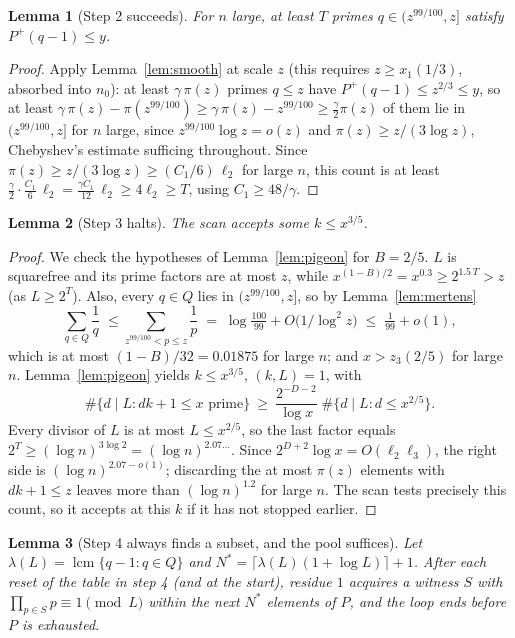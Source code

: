 \documentclass[11pt]{amsart}
\newtheorem{lemma}{Lemma}[section]
\begin{document}
\begin{lemma}[Step 2 succeeds]
For $n$ large, at least $T$ primes $q \in (z^{99/100}, z]$ satisfy
$P^+(q-1) \le y$.
\end{lemma}

\begin{proof}
Apply Lemma~\ref{lem:smooth} at scale $z$ (this requires
$z \ge x_1(1/3)$, absorbed into $n_0$): at least $\gamma\,\pi(z)$ primes
$q \le z$ have $P^+(q-1) \le z^{2/3} \le y$, so at least
$\gamma\,\pi(z) - \pi(z^{99/100}) \ge \gamma\,\pi(z) - z^{99/100}
\ge \tfrac{\gamma}{2}\pi(z)$ of them lie
in $(z^{99/100}, z]$ for $n$ large, since
$z^{99/100}\log z = o(z)$ and $\pi(z) \ge z/(3\log z)$, Chebyshev's
estimate sufficing throughout. Since
$\pi(z) \ge z/(3\log z) \ge (C_1/6)\,\ell_2$ for
large $n$, this count is at least
$\tfrac{\gamma}{2}\cdot\tfrac{C_1}{6}\,\ell_2 = \tfrac{\gamma C_1}{12}\,\ell_2
\ge 4\ell_2 \ge T$, using $C_1 \ge 48/\gamma$.
\end{proof}

\begin{lemma}[Step 3 halts]
\label{lem:halt}
The scan accepts some $k \le x^{3/5}$.
\end{lemma}

\begin{proof}
We check the hypotheses of Lemma~\ref{lem:pigeon} for $B = 2/5$. $L$ is
squarefree and its prime factors are at most $z$, while
$x^{(1-B)/2} = x^{0.3} \ge 2^{1.5\,T} > z$ (as $L \ge 2^T$). Also, every $q \in Q$ lies in $(z^{99/100}, z]$, so by
Lemma~\ref{lem:mertens}
\[
\sum_{q \in Q} \frac{1}{q}
\;\le \sum_{z^{99/100} < p \le z} \frac{1}{p}
\;=\; \log\tfrac{100}{99} + O\!\bigl(1/\log^2 z\bigr)
\;\le\; \tfrac{1}{99} + o(1),
\]
which is at most $(1-B)/32 = 0.01875$ for large $n$; and $x > z_3(2/5)$
for large $n$.
Lemma~\ref{lem:pigeon} yields $k \le x^{3/5}$, $(k,L) = 1$, with
\[
\#\{d \mid L : dk+1 \le x \text{ prime}\}
\ \ge\ \frac{2^{-D-2}}{\log x}\; \#\{d \mid L : d \le x^{2/5}\}.
\]
Every divisor of $L$ is at most $L \le x^{2/5}$, so the last factor
equals $2^{T} \ge (\log n)^{3\log 2} = (\log n)^{2.07\ldots}$. Since
$2^{D+2}\log x = O(\ell_2 \ell_3)$, the right side is
$(\log n)^{2.07 - o(1)}$; discarding the at most $\pi(z)$ elements with
$dk+1 \le z$ leaves more than $(\log n)^{1.2}$ for large $n$. The scan
tests precisely this count, so it accepts at this $k$ if it has not
stopped earlier.
\end{proof}

\begin{lemma}[Step 4 always finds a subset, and the pool suffices]
\label{lem:pool}
Let $\lambda(L) = \operatorname{lcm}\{q - 1 : q \in Q\}$ and
$N^* = \lceil \lambda(L)(1 + \log L)\rceil + 1$. After each reset of the
table in step 4 (and at the start), residue $1$ acquires a witness $S$
with $\prod_{p\in S} p \equiv 1 \pmod L$ within the next $N^*$ elements
of $P$, and the loop ends before $P$ is exhausted.
\end{lemma}
\end{document}
